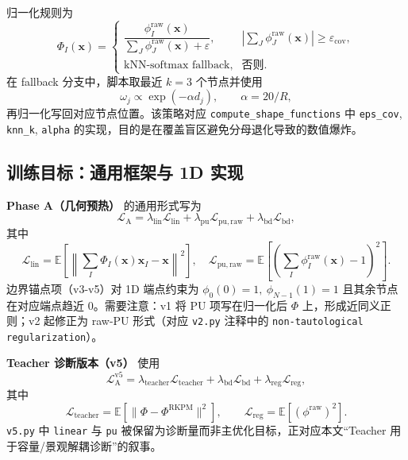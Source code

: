 ﻿\documentclass[lang=cn,a4paper]{elegantpaper}
\begin{document}
归一化规则为
\begin{equation}
  \Phi_I(\bm{x})=
  \begin{cases}
    \dfrac{\phi_I^{\mathrm{raw}}(\bm{x})}{\sum_J\phi_J^{\mathrm{raw}}(\bm{x})+\varepsilon}, & \left|\sum_J\phi_J^{\mathrm{raw}}(\bm{x})\right|\ge\varepsilon_{\mathrm{cov}},\\[1.2ex]
    \text{kNN-softmax fallback}, & \text{否则}.
  \end{cases}
\end{equation}
在 fallback 分支中，脚本取最近 $k=3$ 个节点并使用
\begin{equation}
  \omega_j \propto \exp(-\alpha d_j),\qquad \alpha=20/R,
\end{equation}
再归一化写回对应节点位置。该策略对应 \texttt{compute\_shape\_functions} 中 \texttt{eps\_cov}, \texttt{knn\_k}, \texttt{alpha} 的实现，目的是在覆盖盲区避免分母退化导致的数值爆炸。

\subsection{训练目标：通用框架与 1D 实现}
\textbf{Phase A（几何预热）} 的通用形式写为
\begin{equation}
  \mathcal{L}_{\mathrm{A}}
  =\lambda_{\mathrm{lin}}\mathcal{L}_{\mathrm{lin}}
  +\lambda_{\mathrm{pu}}\mathcal{L}_{\mathrm{pu,raw}}
  +\lambda_{\mathrm{bd}}\mathcal{L}_{\mathrm{bd}},
\end{equation}
其中
\begin{equation}
  \mathcal{L}_{\mathrm{lin}}=\mathbb{E}\left[\left\|\sum_I\Phi_I(\bm{x})\bm{x}_I-\bm{x}\right\|^2\right],\quad
  \mathcal{L}_{\mathrm{pu,raw}}=\mathbb{E}\left[\left(\sum_I\phi_I^{\mathrm{raw}}(\bm{x})-1\right)^2\right].
\end{equation}
边界锚点项（v3-v5）对 1D 端点约束为 $\phi_0(0)=1,\ \phi_{N-1}(1)=1$ 且其余节点在对应端点趋近 0。需要注意：v1 将 PU 项写在归一化后 $\Phi$ 上，形成近同义正则；v2 起修正为 raw-PU 形式（对应 \texttt{v2.py} 注释中的 \texttt{non-tautological regularization}）。

\textbf{Teacher 诊断版本（v5）} 使用
\begin{equation}
  \mathcal{L}_{\mathrm{A}}^{\mathrm{v5}}
  =
  \lambda_{\mathrm{teacher}}\mathcal{L}_{\mathrm{teacher}}
  +\lambda_{\mathrm{bd}}\mathcal{L}_{\mathrm{bd}}
  +\lambda_{\mathrm{reg}}\mathcal{L}_{\mathrm{reg}},
\end{equation}
其中
\begin{equation}
  \mathcal{L}_{\mathrm{teacher}}=\mathbb{E}\!\left[\|\Phi-\Phi^{\mathrm{RKPM}}\|^2\right],\qquad
  \mathcal{L}_{\mathrm{reg}}=\mathbb{E}\!\left[(\phi^{\mathrm{raw}})^2\right].
\end{equation}
\texttt{v5.py} 中 \texttt{linear} 与 \texttt{pu} 被保留为诊断量而非主优化目标，正对应本文“Teacher 用于容量/景观解耦诊断”的叙事。
\end{document}
